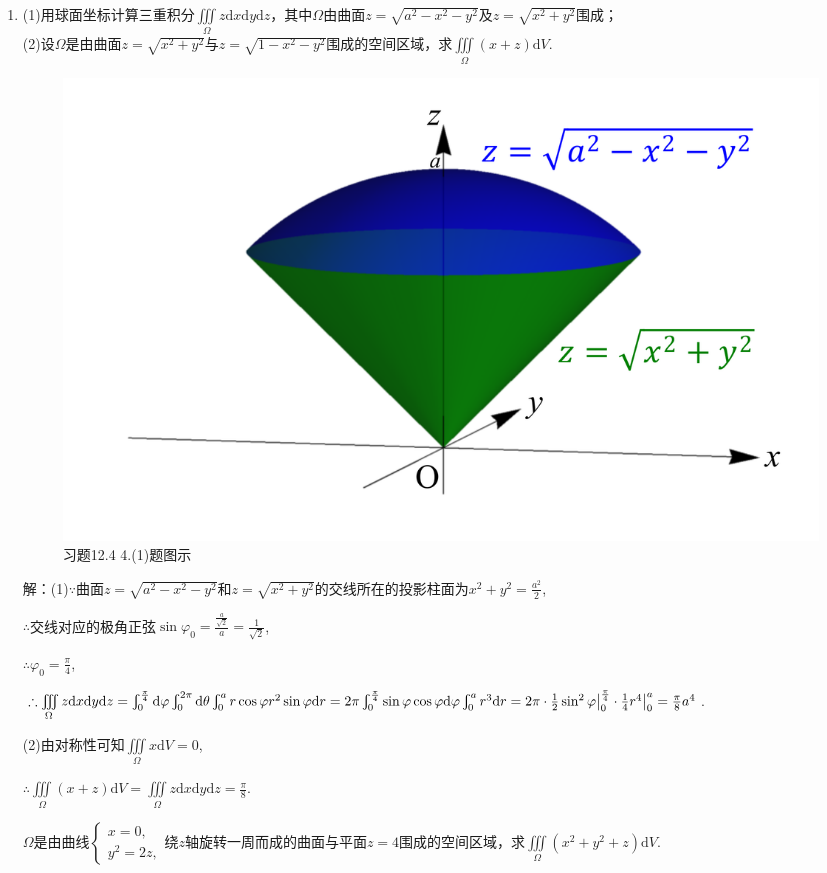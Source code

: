 \documentclass[12pt,UTF8]{ctexart}
\newcommand{\Int}[4]{\varint\nolimits_{#1}^{#2}#3\mathrm d#4}
\newcommand{\IIInt}[3]{\iiint\limits_{#1}#2\mathrm d#3}
\newcommand{\varIIInt}[5]{\iiint\limits_{#1}#2\mathrm d#3\mathrm d#4\mathrm d#5}
\begin{document}
\begin{enumerate}
\item(1)用球面坐标计算三重积分$\varIIInt\Omega zxyz$，其中$\Omega$由曲面$z=\sqrt{a^2-x^2-y^2}$及$z=\sqrt{x^2+y^2}$围成；\\
(2)设$\Omega$是由曲面$z=\sqrt{x^2+y^2}$与$z=\sqrt{1-x^2-y^2}$围成的空间区域，求$\IIInt\Omega{(x+z)}V$.

\begin{figure}[H]
\begin{center}
\includegraphics[height=0.4\textheight]{Figures19/Fig12-4-4-1.pdf}
\end{center}
\caption{习题12.4 4.(1)题图示}
\label{12-4-4-1}
\end{figure}

解：(1)$\because$曲面$z=\sqrt{a^2-x^2-y^2}$和$z=\sqrt{x^2+y^2}$的交线所在的投影柱面为$x^2+y^2=\frac{a^2}2$,

$\therefore$交线对应的极角正弦$\sin\varphi_0=\frac{\frac a{\sqrt2}}{a}=\frac1{\sqrt2}$,

$\therefore\varphi_0=\frac\pi4$,

$\therefore\varIIInt\Omega zxyz=\Int0{\frac\pi4}{}\varphi\Int0{2\pi}{}\theta\Int0a{r\cos\varphi r^2\sin\varphi}r=2\pi\Int0{\frac\pi4}{\sin\varphi\cos\varphi}\varphi\Int0a{r^3}r\\
=2\pi\cdot\frac12\sin^2\varphi\big|_0^{\frac\pi4}\cdot\frac14r^4\big|_0^a=\frac\pi8a^4$.

(2)由对称性可知$\IIInt\Omega{x}V=0$,

$\therefore\IIInt\Omega{(x+z)}V=\varIIInt\Omega{z}xyz=\frac\pi8$.

$\Omega$是由曲线$\begin{cases}
x=0,\\
y^2=2z,
\end{cases}$绕$z$轴旋转一周而成的曲面与平面$z=4$围成的空间区域，求$\IIInt\Omega{(x^2+y^2+z)}V$.


\end{enumerate}
\end{document}
